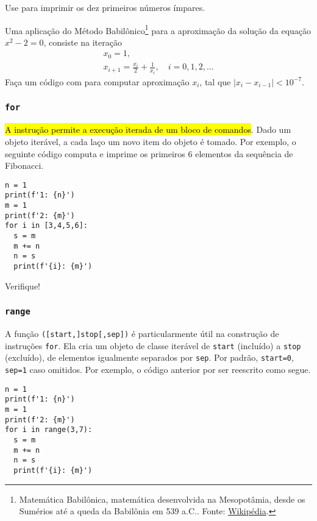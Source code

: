 \begin{exr}
  Use {\PYTHONwhile} para imprimir os dez primeiros números ímpares.
\end{exr}

\begin{exr}
  Uma aplicação do Método Babilônico\footnote{Matemática Babilônica, matemática desenvolvida na Mesopotâmia, desde os Sumérios até a queda da Babilônia em 539 a.C.. Fonte: \href{https://pt.wikipedia.org/wiki/Matem\%C3\%A1tica\_babil\%C3\%B4nica}{Wikipédia}.} para a aproximação da solução da equação $x^2-2 = 0$, consiste na iteração
  \begin{gather}
    x_0 = 1,\\
    x_{i+1} = \frac{x_i}{2} + \frac{1}{x_i},\quad i=0,1,2,\ldots
  \end{gather}
  Faça um código com {\PYTHONwhile} para computar aproximação $x_{i}$, tal que $|x_{i}-x_{i-1}|<10^{-7}$.
\end{exr}

\subsubsection{\texttt{for}}

\hl{A instrução {\PYTHONfor} permite a execução iterada de um bloco de comandos}. Dado um objeto iterável, a cada laço um novo item do objeto é tomado. Por exemplo, o seguinte código computa e imprime os primeiros $6$ elementos da sequência de Fibonacci.

\begin{lstlisting}
n = 1
print(f'1: {n}')
m = 1
print(f'2: {m}')
for i in [3,4,5,6]:
  s = m
  m += n
  n = s
  print(f'{i}: {m}')
\end{lstlisting}

Verifique!

\subsubsection{\texttt{range}}

A função {\PYTHONrange}\texttt{([start,]stop[,sep])} é particularmente útil na construção de instruções \texttt{for}. Ela cria um objeto de classe iterável de \texttt{start} (incluído) a \texttt{stop} (excluído), de elementos igualmente separados por \texttt{sep}. Por padrão, \texttt{start=0}, \texttt{sep=1} caso omitidos. Por exemplo, o código anterior por ser reescrito como segue.

\begin{lstlisting}
n = 1
print(f'1: {n}')
m = 1
print(f'2: {m}')
for i in range(3,7):
  s = m
  m += n
  n = s
  print(f'{i}: {m}')
\end{lstlisting}

